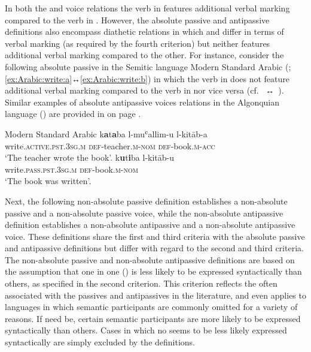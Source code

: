 In both the  and  voice relations the verb in  features additional verbal marking compared to the verb in . However, the absolute passive and antipassive definitions also encompass diathetic relations in which  and  differ in terms of verbal marking (as required by the fourth criterion) but neither  features additional verbal marking compared to the other. For instance, consider the following absolute passive  in the Semitic language Modern Standard Arabic (; \ref{ex:Arabic:write:a}↔\ref{ex:Arabic:write:b}) in which the verb in  does not feature additional verbal marking compared to the verb in  nor vice versa (cf. ~↔~). Similar examples of absolute antipassive voices relations in the Algonquian language  () are provided in  on page \pageref{tab:ch4:pass-antp}.

\ea Modern Standard Arabic \citep[130]{abu-chacra:2007}
	\ea\label{ex:Arabic:write:a}
	\gll	k\textbf{a}t\textbf{a}ba l-muʿallim-u l-kitāb-a \\
			write.\textsc{active.pst.3sg.m} \textsc{def}-teacher.\textsc{m-nom} \textsc{def}-book.\textsc{m-acc} \\
	\glt	‘The teacher wrote the book’.
	\ex\label{ex:Arabic:write:b}
	\gll	k\textbf{u}t\textbf{i}ba l-kitāb-u \\
			write.\textsc{pass.pst.3sg.m} \textsc{def}-book.\textsc{m-nom}\\
	\glt	‘The book was written’.
	\z
\z

Next, the following non-absolute passive definition establishes a non-absolute passive  and a non-absolute passive voice, while the non-absolute antipassive definition establishes a non-absolute antipassive  and a non-absolute antipassive voice. These definitions share the first and third criteria with the absolute passive and antipassive definitions but differ with regard to the second and third criteria. The non-absolute passive and non-absolute antipassive definitions are based on the assumption that one  in one  () is less likely to be expressed syntactically than others, as specified in the second criterion. This criterion reflects the  often associated with the passives and antipassives in the literature, and even applies to languages in which semantic participants are commonly omitted for a variety of reasons. If need be, certain semantic participants are more likely to be expressed syntactically than others. Cases in which no  seems to be less likely expressed syntactically are simply excluded by the definitions.

